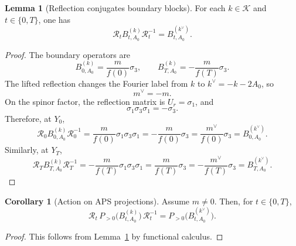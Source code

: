 \documentclass[11pt]{article}
\theoremstyle{definition}
\newtheorem{lemma}[theorem]{Lemma}
\newtheorem{corollary}[theorem]{Corollary}
\numberwithin{equation}{section}
\begin{document}
\begin{lemma}[Reflection conjugates boundary blocks]
\label{lem:sec4_reflection_conjugates_boundary_blocks}
For each \(k\in\mathcal K\) and \(t\in\{0,T\}\), one has
\begin{equation}
\mathcal R_t B^{(k)}_{t,A_0}\mathcal R_t^{-1}
=
B^{(k^\vee)}_{t,A_0}.
\end{equation}
\end{lemma}

\begin{proof}
The boundary operators are
\begin{equation}
B^{(k)}_{0,A_0}
=
\frac{m}{f(0)}\sigma_3,
\qquad
B^{(k)}_{T,A_0}
=
-\frac{m}{f(T)}\sigma_3.
\end{equation}
The lifted reflection changes the Fourier label from \(k\) to \(k^\vee=-k-2A_0\), so
\begin{equation}
m^\vee=-m.
\end{equation}
On the spinor factor, the reflection matrix is \(U_r=\sigma_1\), and
\begin{equation}
\sigma_1\sigma_3\sigma_1=-\sigma_3.
\end{equation}
Therefore, at \(Y_0\),
\begin{equation}
\mathcal R_0 B^{(k)}_{0,A_0}\mathcal R_0^{-1}
=
\frac{m}{f(0)}\sigma_1\sigma_3\sigma_1
=
-\frac{m}{f(0)}\sigma_3
=
\frac{m^\vee}{f(0)}\sigma_3
=
B^{(k^\vee)}_{0,A_0}.
\end{equation}
Similarly, at \(Y_T\),
\begin{equation}
\mathcal R_T B^{(k)}_{T,A_0}\mathcal R_T^{-1}
=
-\frac{m}{f(T)}\sigma_1\sigma_3\sigma_1
=
\frac{m}{f(T)}\sigma_3
=
-\frac{m^\vee}{f(T)}\sigma_3
=
B^{(k^\vee)}_{T,A_0}.
\end{equation}
\end{proof}

\begin{corollary}[Action on APS projections]
\label{cor:sec4_fixed_projector_pairing}
Assume \(m\neq 0\). Then, for \(t\in\{0,T\}\),
\begin{equation}
\mathcal R_t\,P_{>0}\!\bigl(B_{t,A_0}^{(k)}\bigr)\,\mathcal R_t^{-1}
=
P_{>0}\!\bigl(B_{t,A_0}^{(k^\vee)}\bigr).
\end{equation}
\end{corollary}

\begin{proof}
This follows from Lemma~\ref{lem:sec4_reflection_conjugates_boundary_blocks} by functional calculus.
\end{proof}
\end{document}
